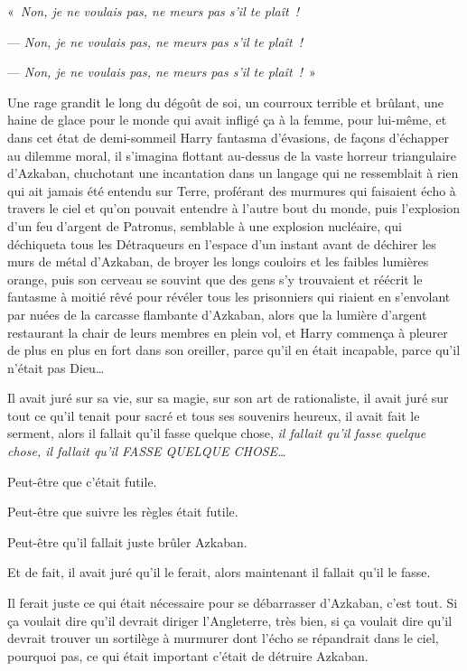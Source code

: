 «~\emph{Non, je ne voulais pas, ne meurs pas s'il te plaît~!}

--- \emph{Non, je ne voulais pas, ne meurs pas s'il te plaît~!}

--- \emph{Non, je ne voulais pas, ne meurs pas s'il te plaît~!}~»

Une rage grandit le long du dégoût de soi, un courroux terrible et brûlant, une haine de glace pour le monde qui avait infligé ça à la femme, pour lui-même, et dans cet état de demi-sommeil Harry fantasma d'évasions, de façons d'échapper au dilemme moral, il s'imagina flottant au-dessus de la vaste horreur triangulaire d'Azkaban, chuchotant une incantation dans un langage qui ne ressemblait à rien qui ait jamais été entendu sur Terre, proférant des murmures qui faisaient écho à travers le ciel et qu'on pouvait entendre à l'autre bout du monde, puis l'explosion d'un feu d'argent de Patronus, semblable à une explosion nucléaire, qui déchiqueta tous les Détraqueurs en l'espace d'un instant avant de déchirer les murs de métal d'Azkaban, de broyer les longs couloirs et les faibles lumières orange, puis son cerveau se souvint que des gens s'y trouvaient et réécrit le fantasme à moitié rêvé pour révéler tous les prisonniers qui riaient en s'envolant par nuées de la carcasse flambante d'Azkaban, alors que la lumière d'argent restaurant la chair de leurs membres en plein vol, et Harry commença à pleurer de plus en plus en fort dans son oreiller, parce qu'il en était incapable, parce qu'il n'était pas Dieu…

Il avait juré sur sa vie, sur sa magie, sur son art de rationaliste, il avait juré sur tout ce qu'il tenait pour sacré et tous ses souvenirs heureux, il avait fait le serment, alors il fallait qu'il fasse quelque chose, \emph{il fallait qu'il fasse quelque chose, il fallait qu'il FASSE QUELQUE CHOSE…}

Peut-être que c'était futile.

Peut-être que suivre les règles était futile.

Peut-être qu'il fallait juste brûler Azkaban.

Et de fait, il avait juré qu'il le ferait, alors maintenant il fallait qu'il le fasse.

Il ferait juste ce qui était nécessaire pour se débarrasser d'Azkaban, c'est tout.
Si ça voulait dire qu'il devrait diriger l'Angleterre, très bien, si ça voulait dire qu'il devrait trouver un sortilège à murmurer dont l'écho se répandrait dans le ciel, pourquoi pas, ce qui était important c'était de détruire Azkaban.

